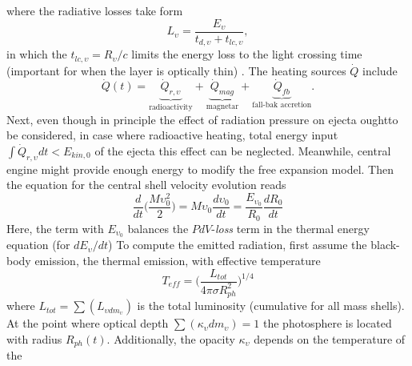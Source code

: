 %
where the radiative losses take form
%
\begin{equation}
L_{\upsilon} = \frac{E_{\upsilon}}{t_{d,\upsilon} + t_{lc,\upsilon}},
\end{equation}
%
in which the $t_{lc,\upsilon} = R_{\upsilon}/c$ limits the energy loss to the 
light crossing time (important for when the layer is optically thin) .
%
The heating sources $\dot{Q}$ include
%
\begin{equation}
\dot{Q}(t) = \underbrace{\dot{Q}_{r,\upsilon}}_{\text{radioactivity}} + \underbrace{\dot{Q}_{mag}}_{\text{magnetar}} + 
\underbrace{\dot{Q}_{fb}}_{\text{fall-bak accretion}}.
\end{equation}
%
%
Next, even though in principle the effect of radiation pressure on ejecta oughtto  be considered, 
in case where radioactive heating, total energy input $\int \dot{Q}_{r,\upsilon}dt < E_{kin,0}$ 
of the ejecta \citep{Metzger:2010,Rosswog:2013kqa} %
this effect can be neglected.
Meanwhile, central engine might provide enough energy to modify the free expansion model. 
Then the equation for the central shell velocity evolution reads 
%
\begin{equation}
\label{eq:theory:mkn:velcenteng}
\frac{d}{dt}\Bigg(\frac{M\upsilon_0^2}{2}\Bigg) = M\upsilon_0\frac{d\upsilon_0}{dt} = \frac{E_{\upsilon_0}}{R_0}\frac{dR_0}{dt}
\end{equation}
%
Here, the term with $E_{\upsilon_0}$ balances the $PdV$-\textit{loss} term in the thermal 
energy equation (for $dE_{\upsilon}/dt$)
%
To compute the emitted radiation, first assume the black-body emission, 
the thermal emission, with effective temperature 
%
\begin{equation}
T_{eff} = \Bigg(\frac{L_{tot}}{4 \pi \sigma R_{ph}^2}\Bigg)^{1/4}
\end{equation}
%
where $L_{tot} = \sum(L_{\upsilon dm_{\upsilon}})$ is the total luminosity 
(cumulative for all mass shells). At the point where optical depth 
$\sum(\kappa_{\upsilon}dm_{\upsilon})=1$ the photosphere is located with radius $R_{ph}(t)$. 
%
%
Additionally, the opacity $\kappa_{\upsilon}$ depends on the temperature of the 
